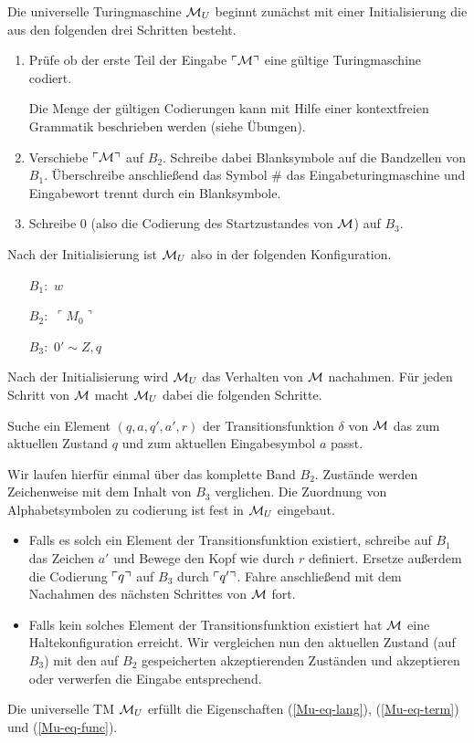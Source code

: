 Die universelle Turingmaschine $\mathcal{M}_U$ beginnt zunächst mit einer Initialisierung die aus den folgenden drei Schritten besteht.

\begin{enumerate}
 \item Prüfe ob der erste Teil der Eingabe $\ulcorner \mathcal{M} \urcorner$ eine gültige Turingmaschine codiert.
 
 Die Menge der gültigen Codierungen kann mit Hilfe einer kontextfreien Grammatik beschrieben werden (siehe Übungen).
 
 \item Verschiebe $\ulcorner \mathcal{M} \urcorner$ auf $B_2$. Schreibe dabei Blanksymbole auf die Bandzellen von $B_1$.
 Überschreibe anschließend das Symbol $\#$ das Eingabeturingmaschine und Eingabewort trennt durch ein Blanksymbole.
 
 \item Schreibe $0$ (also die Codierung des Startzustandes von $\mathcal{M}$) auf $B_3$.
\end{enumerate}

Nach der Initialisierung ist $\mathcal{M}_U$ also in der folgenden Konfiguration.
\begin{itemize}
\item[$B_1:$] $w$
\item[$B_2:$] $\ulcorner M_0 \urcorner$
\item[$B_3:$] $0' \sim Z,q$
\end{itemize}

Nach der Initialisierung wird $\mathcal{M}_U$ das Verhalten von $\mathcal{M}$ nachahmen.
Für jeden Schritt von $\mathcal{M}$ macht $\mathcal{M}_U$ dabei die folgenden Schritte.

 Suche ein Element $(q, a, q', a', r)$ der Transitionsfunktion $\delta$ von $\mathcal{M}$ das zum aktuellen Zustand $q$ und zum aktuellen Eingabesymbol $a$ passt.
 
 Wir laufen hierfür einmal über das komplette Band $B_2$. 
 Zustände werden Zeichenweise mit dem Inhalt von $B_3$ verglichen.
 Die Zuordnung von Alphabetsymbolen zu codierung ist fest in $\mathcal{M}_U$ eingebaut.
 
 \begin{itemize}
 
 \item Falls es solch ein Element der Transitionsfunktion existiert,
    schreibe auf $B_1$ das Zeichen $a'$ und Bewege den Kopf wie durch $r$ definiert.
    Ersetze außerdem die Codierung $\ulcorner q \urcorner$ auf $B_3$ durch $\ulcorner q' \urcorner$.
    Fahre anschließend mit dem Nachahmen des nächsten Schrittes von $\mathcal{M}$ fort.
    
 \item Falls kein solches Element der Transitionsfunktion existiert hat $\mathcal{M}$ eine Haltekonfiguration erreicht.
 Wir vergleichen nun den aktuellen Zustand (auf $B_3$) mit den auf $B_2$ gespeicherten akzeptierenden Zuständen und akzeptieren oder verwerfen die Eingabe entsprechend.

\end{itemize}

\begin{Satz}
	Die universelle \ac{TM} $\mathcal{M}_U$ erfüllt die Eigenschaften (\ref{Mu-eq-lang}), (\ref{Mu-eq-term}) und (\ref{Mu-eq-func}).
\end{Satz}


